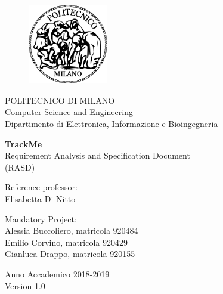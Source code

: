 \thispagestyle{empty}

\vspace*{-2.5cm} 
\bfseries{
    \begin{center}
    
    \begin{figure}[htbp]
        \begin{center}
          \includegraphics[width=3.5cm]{./pictures/logopm}
        \end{center}
      \end{figure}
    
      \large
      POLITECNICO DI MILANO\\
      \normalsize
      Computer Science and Engineering \\
      Dipartimento di Elettronica, Informazione e Bioingegneria\\
      
      \vspace*{3.3cm} \LARGE
    
      \textbf{TrackMe}\\
      
      \vspace*{.75truecm} \large
        Requirement Analysis and Specification Document \\
        (RASD)
    \end{center}

    \vspace*{2.0cm} \large
    \begin{flushleft}
    
      Reference professor: \\
      Elisabetta Di Nitto
    
    \end{flushleft}
    
    \vspace*{1.0cm}
    \begin{flushright}
    
    Mandatory Project:\\
    Alessia Buccoliero, matricola 920484\\
    Emilio Corvino, matricola 920429\\
    Gianluca Drappo, matricola 920155
    
    \end{flushright}
    
    \vspace*{0.5cm}
    \begin{center}
    
      Anno Accademico 2018-2019 \\
      
      \vspace*{1.0cm}
      Version 1.0
    \end{center} \clearpage
}